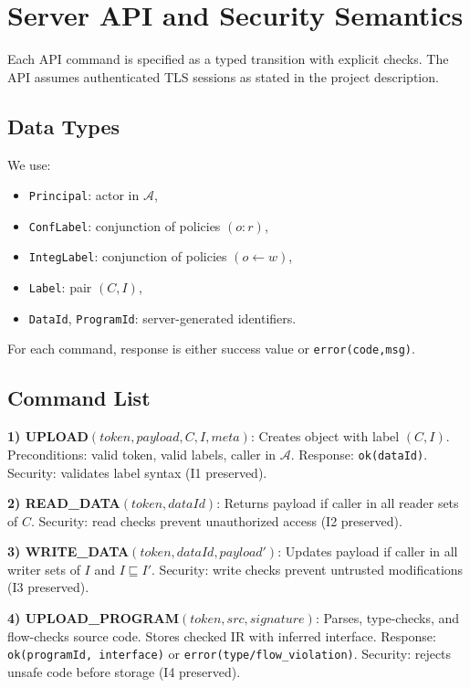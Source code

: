 \section{Server API and Security Semantics}

Each API command is specified as a typed transition with explicit checks. The API assumes authenticated TLS sessions as stated in the project description.

\subsection{Data Types}

We use:
\begin{itemize}
    \item \texttt{Principal}: actor in $\mathcal{A}$,
    \item \texttt{ConfLabel}: conjunction of policies $(o:r)$,
    \item \texttt{IntegLabel}: conjunction of policies $(o \leftarrow w)$,
    \item \texttt{Label}: pair $(C,I)$,
    \item \texttt{DataId}, \texttt{ProgramId}: server-generated identifiers.
\end{itemize}

For each command, response is either success value or \texttt{error(code,msg)}.

\subsection{Command List}

\textbf{1) UPLOAD}$(token, payload, C, I, meta)$: Creates object with label $(C,I)$. Preconditions: valid token, valid labels, caller in $\mathcal{A}$. Response: \texttt{ok(dataId)}. Security: validates label syntax (I1 preserved).

\textbf{2) READ\_DATA}$(token, dataId)$: Returns payload if caller in all reader sets of $C$. Security: read checks prevent unauthorized access (I2 preserved).

\textbf{3) WRITE\_DATA}$(token, dataId, payload')$: Updates payload if caller in all writer sets of $I$ and $I \sqsubseteq I'$. Security: write checks prevent untrusted modifications (I3 preserved).

\textbf{4) UPLOAD\_PROGRAM}$(token, src, signature)$: Parses, type-checks, and flow-checks source code. Stores checked IR with inferred interface. Response: \texttt{ok(programId, interface)} or \texttt{error(type/flow\_violation)}. Security: rejects unsafe code before storage (I4 preserved).

